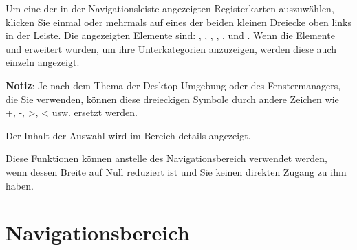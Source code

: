 Um eine der in der Navigationsleiste angezeigten Registerkarten auszuwählen, klicken Sie einmal oder mehrmals auf eines der beiden kleinen Dreiecke oben links in der Leiste.  Die angezeigten Elemente sind: , , , , ,  und .  Wenn die Elemente  und  erweitert wurden, um ihre Unterkategorien anzuzeigen, werden diese auch einzeln angezeigt.%


\textbf{Notiz}: Je nach dem Thema der Desktop-Umgebung oder des Fenstermanagers, die Sie verwenden, können diese dreieckigen Symbole durch andere Zeichen wie +, -, >, < usw. ersetzt werden.%

Der Inhalt der Auswahl wird im Bereich details angezeigt.%

Diese Funktionen können anstelle des Navigationsbereich verwendet werden, wenn dessen Breite auf Null reduziert ist und Sie keinen direkten Zugang zu ihm haben.%


\section{Navigationsbereich\label{home-accounting}}

